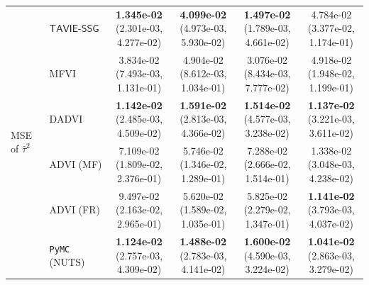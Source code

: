 \documentclass[12pt]{article}
\numberwithin{equation}{section}
\newcommand{\tssg}{\mathsf{TAVIE}\text{-}\mathsf{SSG}}
\begin{document}
{\begin{longtable}{llcccc}
\multirow{6}{*}{MSE of $\widehat{\tau}^{2}$}
& $\tssg$ & \makecell[c]{\textbf{1.345e-02}\\(2.301e-03, 4.277e-02)} & \makecell[c]{\textbf{4.099e-02}\\(4.973e-03, 5.930e-02)} & \makecell[c]{\textbf{1.497e-02}\\(1.789e-03, 4.661e-02)} & \makecell[c]{4.784e-02\\(3.377e-02, 1.174e-01)} \\
& MFVI & \makecell[c]{3.834e-02\\(7.493e-03, 1.131e-01)} & \makecell[c]{4.904e-02\\(8.612e-03, 1.034e-01)} & \makecell[c]{3.076e-02\\(8.434e-03, 7.777e-02)} & \makecell[c]{4.918e-02\\(1.948e-02, 1.199e-01)} \\
& DADVI & \makecell[c]{\textbf{1.142e-02}\\(2.485e-03, 4.509e-02)} & \makecell[c]{\textbf{1.591e-02}\\(2.813e-03, 4.366e-02)} & \makecell[c]{\textbf{1.514e-02}\\(4.577e-03, 3.238e-02)} & \makecell[c]{\textbf{1.137e-02}\\(3.221e-03, 3.611e-02)} \\
& ADVI (MF) & \makecell[c]{7.109e-02\\(1.809e-02, 2.376e-01)} & \makecell[c]{5.746e-02\\(1.346e-02, 1.289e-01)} & \makecell[c]{7.288e-02\\(2.666e-02, 1.514e-01)} & \makecell[c]{1.338e-02\\(3.048e-03, 4.238e-02)} \\
& ADVI (FR) & \makecell[c]{9.497e-02\\(2.163e-02, 2.965e-01)} & \makecell[c]{5.620e-02\\(1.589e-02, 1.035e-01)} & \makecell[c]{5.825e-02\\(2.279e-02, 1.347e-01)} & \makecell[c]{\textbf{1.141e-02}\\(3.793e-03, 4.037e-02)} \\
& \texttt{PyMC} (NUTS) & \makecell[c]{\textbf{1.124e-02}\\(2.757e-03, 4.309e-02)} & \makecell[c]{\textbf{1.488e-02}\\(2.783e-03, 4.141e-02)} & \makecell[c]{\textbf{1.600e-02}\\(4.590e-03, 3.224e-02)} & \makecell[c]{\textbf{1.041e-02}\\(2.863e-03, 3.279e-02)} \\
\hline


\end{longtable}}
\end{document}
